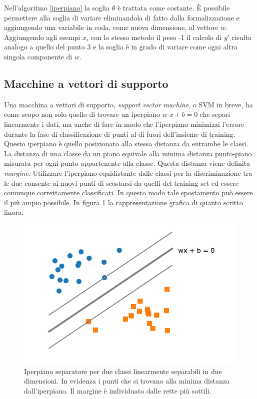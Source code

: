 \documentclass [11pt,a4paper,twoside,openright] {book}
\begin{document}
Nell'algoritmo \ref{iperpiano} la soglia $\theta$ è trattata come costante. È possibile permettere alla soglia di variare eliminandola di fatto dalla formalizzazione e aggiungendo una variabile in coda, come nuova dimensione, al vettore $w$. Aggiungendo agli esempi $x_i$ con lo stesso metodo il peso -1 il calcolo di $y'$ risulta analogo a quello del punto 3 e la soglia è in grado di variare come ogni altra singola componente di $w$.
\subsection{Macchine a vettori di supporto}
Una macchina a vettori di supporto, \textit{support vector machine}, o SVM in breve, ha come scopo non solo quello di trovare un iperpiano $w \boldsymbol{\cdot} x + b = 0$ che separi linearmente i dati, ma anche di fare in modo che l'iperpiano minimizzi l'errore durante la fase di classificazione di punti al di fuori dell'insieme di training. Questo iperpiano è quello posizionato alla stessa distanza da entrambe le classi. La distanza di una classe da un piano equivale alla minima distanza punto-piano misurata per ogni punto appartenente alla classe. Questa distanza viene definita \textit{margine}. Utilizzare l'iperpiano equidistante dalle classi per la discriminazione tra le due consente ai nuovi punti di scostarsi da quelli del training set ed essere comunque correttamente classificati. In questo modo tale spostamento può essere il più ampio possibile. In figura \ref{margine} la rappresentazione grafica di quanto scritto finora.
\begin{figure}[!h]
\centering
\includegraphics[scale=.6]{figure/margine.pdf}
\caption{Iperpiano separatore per due classi linearmente separabili in due dimensioni. In evidenza  i punti che si trovano alla minima distanza dall'iperpiano.  Il margine è individuato dalle rette più sottili.\label{margine}}
\end{figure}\\
\end{document}
